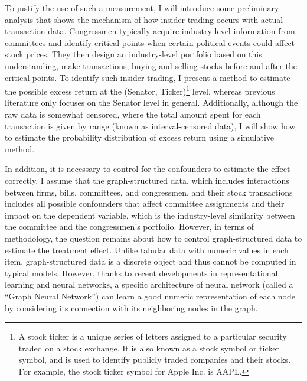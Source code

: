 \documentclass[15pt,letterpaper]{article}
\begin{document}


To justify the use of such a measurement, I will introduce some preliminary analysis that shows the mechanism of how insider trading occurs with actual transaction data. Congressmen typically acquire industry-level information from committees and identify critical points when certain political events could affect stock prices. They then design an industry-level portfolio based on this understanding, make transactions, buying and selling stocks before and after the critical points. To identify such insider trading, I present a method to estimate the possible excess return at the (Senator, Ticker)\footnote{A stock ticker is a unique series of letters assigned to a particular security traded on a stock exchange. It is also known as a stock symbol or ticker symbol, and is used to identify publicly traded companies and their stocks. For example, the stock ticker symbol for Apple Inc. is AAPL.} level, whereas previous literature \citep{zi11,zi24,eg13} only focuses on the Senator level in general. Additionally, although the raw data is somewhat censored, where the total amount spent for each transaction is given by range (known as interval-censored data), I will show how to estimate the probability distribution of excess return using a simulative method.

In addition, it is necessary to control for the confounders to estimate the effect correctly. I assume that the graph-structured data, which includes interactions between firms, bills, committees, and congressmen, and their stock transactions includes all possible confounders that affect committee assignments and their impact on the dependent variable, which is the industry-level similarity between the committee and the congressmen's portfolio. However, in terms of methodology, the question remains about how to control graph-structured data to estimate the treatment effect. Unlike tabular data with numeric values in each item, graph-structured data is a discrete object and thus cannot be computed in typical models.
However, thanks to recent developments in representational learning and neural networks, a specific architecture of neural network (called a ``Graph Neural Network'') can learn a good numeric representation of each node by considering its connection with its neighboring nodes in the graph.
\end{document}
